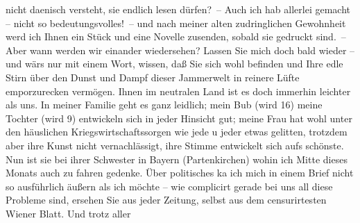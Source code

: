 \begin{ledgroupsized}[t]{13cm}
               nicht daenisch versteht, sie endlich lesen dürfen? – Auch ich hab allerlei gemacht –
               nicht so bedeutungsvolles! – und nach meiner alten zudringlichen Gewohnheit werd ich
               Ihnen ein Stück und eine Novelle zusenden, sobald sie
               gedruckt sind. – Aber wann werden wir einander wiedersehen? Lassen Sie mich doch bald
               wieder – und wärs nur mit einem Wort, wissen, daß Sie sich wohl befinden und Ihre
               edle Stirn über den Dunst und Dampf dieser Jammerwelt in {\pb}reinere Lüfte emporzurecken vermögen. Ihnen im
               neutralen Land ist es doch
               immerhin leichter als uns. In meiner Familie geht es ganz leidlich; mein Bub (wird 16) meine Tochter (wird 9) entwickeln
               sich in jeder Hinsicht gut; meine Frau hat wohl unter den häuslichen Kriegswirtschaftssorgen wie jede u jeder
               etwas gelitten, trotzdem aber ihre Kunst nicht vernachlässigt, ihre Stimme entwickelt
               sich aufs schönste. Nun ist sie bei ihrer Schwester in Bayern
                  (Partenkirchen) wohin ich Mitte dieses Monats
               auch zu fahren gedenke. Über politisches ka{\geminationn} ich mich in
               einem Brief nicht so ausführlich äußern als ich möchte – wie complicirt gerade bei
               uns all diese Probleme sind, ersehen Sie aus jeder Zeitung, selbst aus dem
               censurirtesten Wiener Blatt. Und trotz aller

\end{ledgroupsized}
